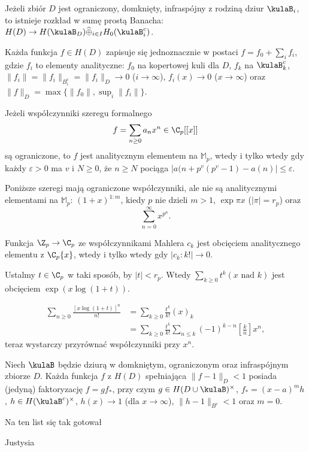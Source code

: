 \begin{twierdzenie}
	Jeżeli zbiór $D$ jest ograniczony, domknięty, infraspójny z rodziną dziur $\kulaB_i$, to istnieje rozkład w sumę prostą Banacha: $H(D) \to H(\kulaB_D) \widehat{\oplus}_{i \in I} H_0(\kulaB_i^c)$.

	Każda funkcja $f \in H(D)$ zapisuje się jednoznacznie w postaci $f = f_0 + \sum_i f_i$, gdzie $f_i$ to elementy analityczne: $f_0$ na kopertowej kuli dla $D$, $f_k$ na $\kulaB_k^c$, $\|f_i\| = \|f_i\|_{B^c_i} = \|f_i\|_D \to 0$ ($i \to \infty$), $f_i(x) \to 0$ ($x \to \infty$) oraz $\|f\|_D = \max\{\|f_0\|, \sup_i \|f_i\|\}$.
\end{twierdzenie}

\begin{twierdzenie}
	Jeżeli współczynniki szeregu formalnego 
	\[
		f = \sum_{n \ge 0} a_n x^n \in \C_p[[x]]
	\]
	są ograniczone, to $f$ jest analitycznym elementem na $\mathbb M_p$, wtedy i tylko wtedy gdy każdy $\varepsilon > 0$ ma $v$ i $N \ge 0$, że $n \ge N$ pociąga $|a(n+p^v(p^v-1) - a(n)| \le \varepsilon$.
\end{twierdzenie}

\begin{przyklad}
	Poniższe szeregi mają ograniczone współczynniki, ale nie są analitycznymi elementami na $\mathbb M_p$: $(1+x)^{1:m}$, kiedy $p$ nie dzieli $m > 1$, $\exp \pi x$ ($|\pi| = r_p$) oraz
	\[
		\sum_{n = 0}^\infty x^{p^n}.
	\]
\end{przyklad}

\begin{fakt}
	Funkcja $\Z_p \to \C_p$ ze współczynnikami Mahlera $c_k$ jest obcięciem analitycznego elementu z $\C_p\{x\}$, wtedy i tylko wtedy gdy $|c_k : k!| \to 0$.
\end{fakt}

\begin{przyklad}
	Ustalmy $t \in \C_p$ w taki sposób, by $|t| < r_p$.
	Wtedy $\sum_{k \ge 0} t^k (x \textrm{ nad } k)$ jest obcięciem $\exp (x \log (1+t))$.
\end{przyklad}

\begin{wniosek}[z przykładu]
	\begin{align*}
		\sum_{n \ge 0} \frac{[x \log(1+t)]^n}{n!} & = \sum_{k \ge 0} \frac {t^k}{k!}(x)_k \\
		& = \sum_{k \ge 0} \frac{t^k}{k!} \sum_{n \le k} (-1)^{k-n} \left[\frac k n\right] x^n,
	\end{align*}
	teraz wystarczy przyrównać współczynniki przy $x^n$.
\end{wniosek}

\begin{twierdzenie}[Motzkin]
	Niech $\kulaB$ będzie dziurą w domkniętym, ograniczonym oraz infraspójnym zbiorze $D$.
	Każda funkcja $f$ z $H(D)$ spełniająca $\|f - 1 \|_D < 1$ posiada (jedyną) faktoryzację $f = gf_*$, przy czym $g \in H(D \cup \kulaB)^\times$, $f_* = (x-a)^m h$, $h \in H(\kulaB^c)^\times$, $h(x) \to 1$ (dla $x \to \infty$), $\|h - 1\|_{B^c} < 1$ oraz $m = 0$.
\end{twierdzenie}


Na ten list się tak gotował

Justysia